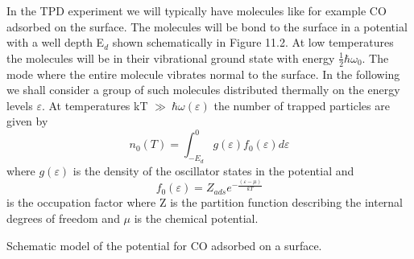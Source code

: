 In the TPD experiment we will typically have molecules like for example CO adsorbed on the surface. The molecules will  be bond to the surface in a potential with a well  depth E$_d$  shown schematically in Figure 11.2. At low temperatures the molecules will be in their vibrational ground state with energy $\frac{1}{2}\hbar \omega_0$. The mode where the entire molecule vibrates normal to  the surface. In the following we shall consider a group of such molecules distributed thermally  on the energy levels $\varepsilon$.
At temperatures kT $\gg \ \hbar \omega(\varepsilon)$ the number of trapped particles are given by 
\begin{equation}
n_{0}(T) = \int _{-E_d}^{0} g(\varepsilon)f_0(\varepsilon)d\varepsilon
\end{equation}
where $g(\varepsilon)$ is the density of the oscillator states in the potential and  
\begin{equation}
f_0(\varepsilon) = Z_{ads}e^{-\frac{(\varepsilon-\mu)}{kT}}
\end{equation}
is the occupation factor where Z is the partition function describing the internal degrees of freedom  and $\mu$ is the chemical potential.

\vspace*{11cm}

 Schematic model of the potential for CO adsorbed on a surface.

\vspace{1cm}




